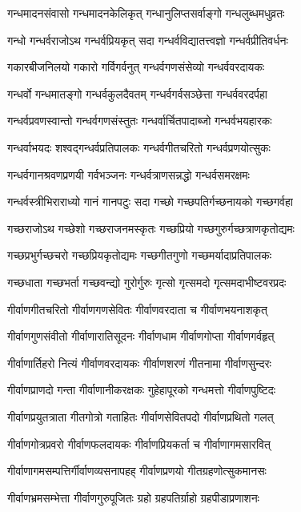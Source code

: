 \twolineshloka
{गन्धमादनसंवासो गन्धमादनकेलिकृत्}%
{गन्धानुलिप्तसर्वाङ्गो गन्धलुब्धमधुव्रतः}%

\twolineshloka
{गन्धो गन्धर्वराजोऽथ गन्धर्वप्रियकृत् सदा}%
{गन्धर्वविद्यातत्त्वज्ञो गन्धर्वप्रीतिवर्धनः}%

\twolineshloka
{गकारबीजनिलयो गकारो गर्विगर्वनुत्}%
{गन्धर्वगणसंसेव्यो गन्धर्ववरदायकः}%

\twolineshloka
{गन्धर्वो गन्धमातङ्गो गन्धर्वकुलदैवतम्}%
{गन्धर्वगर्वसञ्छेत्ता गन्धर्ववरदर्पहा}%

\twolineshloka
{गन्धर्वप्रवणस्वान्तो गन्धर्वगणसंस्तुतः}%
{गन्धर्वार्चितपादाब्जो गन्धर्वभयहारकः}%

\twolineshloka
{गन्धर्वाभयदः शश्वद्गन्धर्वप्रतिपालकः}%
{गन्धर्वगीतचरितो गन्धर्वप्रणयोत्सुकः}%

\twolineshloka
{गन्धर्वगानश्रवणप्रणयी गर्वभञ्जनः}%
{गन्धर्वत्राणसन्नद्धो गन्धर्वसमरक्षमः}%

\twolineshloka
{गन्धर्वस्त्रीभिराराध्यो गानं गानपटुः सदा}%
{गच्छो गच्छपतिर्गच्छनायको गच्छगर्वहा}%

\twolineshloka
{गच्छराजोऽथ गच्छेशो गच्छराजनमस्कृतः}%
{गच्छप्रियो गच्छगुरुर्गच्छत्राणकृतोद्यमः}%

\twolineshloka
{गच्छप्रभुर्गच्छचरो गच्छप्रियकृतोद्यमः}%
{गच्छगीतगुणो गच्छमर्यादाप्रतिपालकः}%

\twolineshloka
{गच्छधाता गच्छभर्ता गच्छवन्द्यो गुरोर्गुरुः}%
{गृत्सो गृत्समदो गृत्समदाभीष्टवरप्रदः}%

\twolineshloka
{गीर्वाणगीतचरितो गीर्वाणगणसेवितः}%
{गीर्वाणवरदाता च गीर्वाणभयनाशकृत्}%

\twolineshloka
{गीर्वाणगुणसंवीतो गीर्वाणारातिसूदनः}%
{गीर्वाणधाम गीर्वाणगोप्ता गीर्वाणगर्वहृत्}%

\twolineshloka
{गीर्वाणार्तिहरो नित्यं गीर्वाणवरदायकः}%
{गीर्वाणशरणं गीतनामा गीर्वाणसुन्दरः}%

\twolineshloka
{गीर्वाणप्राणदो गन्ता गीर्वाणानीकरक्षकः}%
{गुहेहापूरको गन्धमत्तो गीर्वाणपुष्टिदः}%

\twolineshloka
{गीर्वाणप्रयुतत्राता गीतगोत्रो गताहितः}%
{गीर्वाणसेवितपदो गीर्वाणप्रथितो गलत्}%

\twolineshloka
{गीर्वाणगोत्रप्रवरो गीर्वाणफलदायकः}%
{गीर्वाणप्रियकर्ता च गीर्वाणागमसारवित्}%

\twolineshloka
{गीर्वाणागमसम्पत्तिर्गीर्वाणव्यसनापहह्}%
{गीर्वाणप्रणयो गीतग्रहणोत्सुकमानसः}%

\twolineshloka
{गीर्वाणभ्रमसम्भेत्ता गीर्वाणगुरुपूजितः}%
{ग्रहो ग्रहपतिर्ग्राहो ग्रहपीडाप्रणाशनः}%


